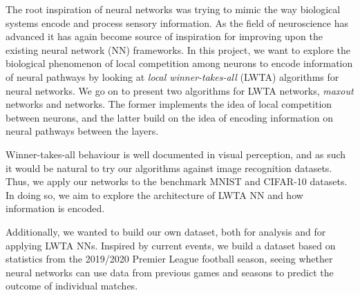 The root inspiration of neural networks was trying to mimic the way biological systems encode and process sensory information. As the field of neuroscience has advanced it has again become source of inspiration for improving upon the existing neural network (NN) frameworks. In this project, we want to explore the biological phenomenon of local competition among neurons to encode information of neural pathways by looking at \textit{local winner-takes-all} (LWTA) algorithms for neural networks. We go on to present two algorithms for LWTA networks, \textit{maxout} networks and  networks. The former implements the idea of local competition between neurons, and the latter build on the idea of encoding information on neural pathways between the layers.

Winner-takes-all behaviour is well documented in visual perception, and as such it would be natural to try our algorithms against image recognition datasets. Thus, we apply our networks to the benchmark MNIST and CIFAR-10 datasets. In doing so, we aim to explore the architecture of LWTA NN and how information is encoded.

Additionally, we wanted to build our own dataset, both for analysis and for applying LWTA NNs. Inspired by current events, we build a dataset based on statistics from the 2019/2020 Premier League football season, seeing whether neural networks can use data from previous games and seasons to predict the outcome of individual matches.
